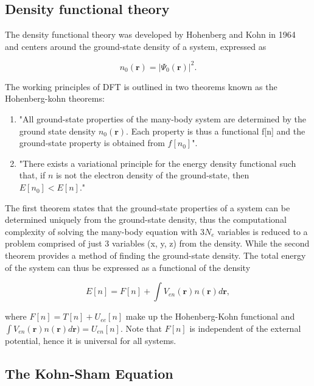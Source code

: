 \subsection{Density functional theory}

The density functional theory was developed by Hohenberg and Kohn in 1964 and centers around the ground-state density of a system, expressed as

\begin{equation}
    n_0(\boldsymbol{r}) = |\Psi_0(\boldsymbol{r})|^2.  
\end{equation}

The working principles of DFT is outlined in two theorems known as the Hohenberg-kohn theorems:

\begin{enumerate}
\item "All ground-state properties of the many-body system are determined by the ground state density $n_0(\boldsymbol{r})$. Each property is thus a functional f[n] and the ground-state property is obtained from $f[n_0]$". 
\item "There exists a variational principle for the energy density functional such that, if $n$ is not the electron density of the ground-state, then $E[n_0] < E[n]$."
\end{enumerate}

The first theorem states that the ground-state properties of a system can be determined uniquely from the ground-state density, thus the computational complexity of solving the many-body equation with $3N_e$ variables is reduced to a problem comprised of just 3 variables (x, y, z) from the density. While the second theorem provides a method of finding the ground-state density. The total energy of the system can thus be expressed as a functional of the density

\begin{equation}
    E[n] = F[n] + \int V_{en}(\boldsymbol{r})n(\boldsymbol{r})d\boldsymbol{r},
\end{equation}

where $F[n] = T[n] + U_{ee}[n]$ make up the Hohenberg-Kohn functional and $\int V_{en}(\boldsymbol{r})n(\boldsymbol{r})d\boldsymbol{r}) = U_{en}[n]$.
Note that $F[n]$ is independent of the external potential, hence it is universal for all systems.  

\subsection{The Kohn-Sham Equation}

